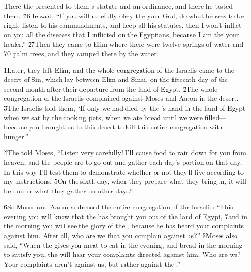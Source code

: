 There the  presented to them a statute and an ordinance, and there he tested them. \v{26}He said, ``If you will carefully obey the  your God, do what he sees to be right, listen to his commandments, and keep all his statutes, then I won't inflict on you all the diseases that I inflicted on the Egyptians, because I am the  your healer.'' \v{27}Then they came to Elim where there were twelve springs of water and 70 palm trees, and they camped there by the water.

\v{1}Later, they left Elim, and the whole congregation of the Israelis came to the desert of Sin, which lay between Elim and Sinai, on the fifteenth day of the second month after their departure from the land of Egypt. \v{2}The whole congregation of the Israelis complained against Moses and Aaron in the desert. \v{3}The Israelis told them, ``If only we had died by the 's hand in the land of Egypt when we sat by the cooking pots, when we ate bread until we were filled---because you brought us to this desert to kill this entire congregation with hunger.''

\v{4}The  told Moses, ``Listen very carefully! I'll cause food to rain down for you from heaven, and the people are to go out and gather each day's portion on that day. In this way I'll test them to demonstrate whether or not they'll live according to my instructions. \v{5}On the sixth day, when they prepare what they bring in, it will be double what they gather on other days.''

\v{6}So Moses and Aaron addressed the entire congregation of the Israelis: ``This evening you will know that the  has brought you out of the land of Egypt, \v{7}and in the morning you will see the glory of the , because he has heard your complaints against him. After all, who are we that you complain against us?'' \v{8}Moses also said, ``When the  gives you meat to eat in the evening, and bread in the morning to satisfy you, the  will hear your complaints directed against him. Who are we? Your complaints aren't against us, but rather against the .''

